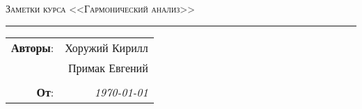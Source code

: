 
\begin{center}
    \LARGE \textsc{Заметки курса <<Гармонический анализ>>}
\end{center}

\hrule

\phantom{42}

\begin{flushright}
    \begin{tabular}{rr}
        \textbf{Авторы}: 
        & Хоружий Кирилл \\
        & Примак Евгений \\
        &\\
        \textbf{От}: &
        \textit{\today}\\
    \end{tabular}
\end{flushright}

\thispagestyle{empty}
\tableofcontents
\newpage